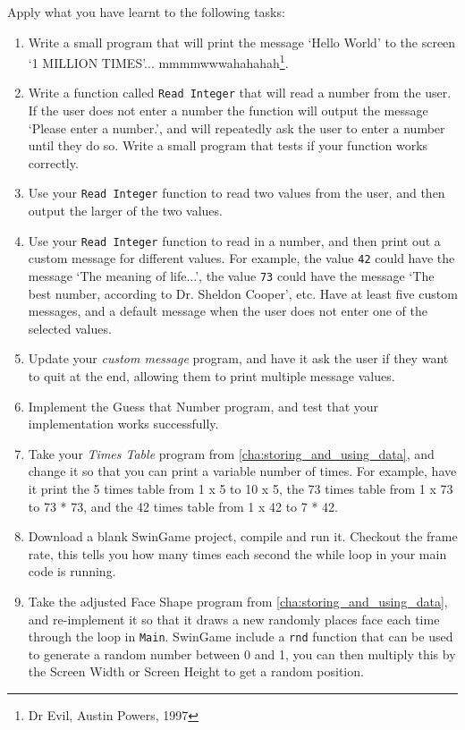 Apply what you have learnt to the following tasks:
\begin{enumerate}
  \item Write a small program that will print the message `Hello World' to the screen `1 MILLION TIMES'... mmmmwwwahahahah\footnote{Dr Evil, Austin Powers, 1997}.
  \item Write a function called \texttt{Read Integer} that will read a number from the user. If the user does not enter a number the function will output the message `Please enter a number.', and will repeatedly ask the user to enter a number until they do so. Write a small program that tests if your function works correctly.
  
  
  \item Use your \texttt{Read Integer} function to read two values from the user, and then output the larger of the two values.
  
  \item Use your \texttt{Read Integer} function to read in a number, and then print out a custom message for different values. For example, the value \texttt{42} could have the message `The meaning of life...', the value \texttt{73} could have the message `The best number, according to Dr. Sheldon Cooper', etc. Have at least five custom messages, and a default message when the user does not enter one of the selected values.
  
  \item Update your \emph{custom message} program, and have it ask the user if they want to quit at the end, allowing them to print multiple message values.
  
  \item Implement the Guess that Number program, and test that your implementation works successfully.
  \item Take your \emph{Times Table} program from \cref{cha:storing_and_using_data}, and change it so that you can print a variable number of times. For example, have it print the 5 times table from 1 x 5 to 10 x 5, the 73 times table from 1 x 73 to 73 * 73, and the 42 times table from 1 x 42 to 7 * 42.
  \item Download a blank SwinGame project, compile and run it. Checkout the frame rate, this tells you how many times each second the while loop in your main code is running.
  \item Take the adjusted Face Shape program from \cref{cha:storing_and_using_data}, and re-implement it so that it draws a new randomly places face each time through the loop in \texttt{Main}. SwinGame include a \texttt{rnd} function that can be used to generate a random number between 0 and 1, you can then multiply this by the Screen Width or Screen Height to get a random position.
  

\end{enumerate}
